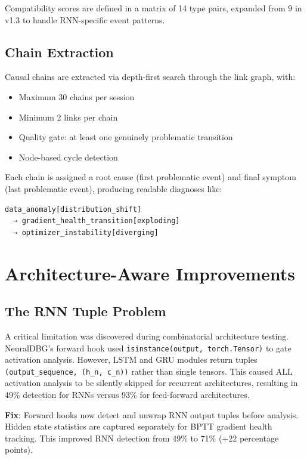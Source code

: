 \documentclass[11pt]{article}
\begin{document}
Compatibility scores are defined in a matrix of 14 type pairs, expanded from 9 in v1.3 to handle RNN-specific event patterns.

\subsection{Chain Extraction}

Causal chains are extracted via depth-first search through the link graph, with:
\begin{itemize}
    \item Maximum 30 chains per session
    \item Minimum 2 links per chain
    \item Quality gate: at least one genuinely problematic transition
    \item Node-based cycle detection
\end{itemize}

Each chain is assigned a root cause (first problematic event) and final symptom (last problematic event), producing readable diagnoses like:

\begin{verbatim}
data_anomaly[distribution_shift]
  → gradient_health_transition[exploding]
  → optimizer_instability[diverging]
\end{verbatim}

\section{Architecture-Aware Improvements}

\subsection{The RNN Tuple Problem}

A critical limitation was discovered during combinatorial architecture testing. NeuralDBG's forward hook used \texttt{isinstance(output, torch.Tensor)} to gate activation analysis. However, LSTM and GRU modules return tuples \texttt{(output\_sequence, (h\_n, c\_n))} rather than single tensors. This caused ALL activation analysis to be silently skipped for recurrent architectures, resulting in 49\% detection for RNNs versus 93\% for feed-forward architectures.

\textbf{Fix}: Forward hooks now detect and unwrap RNN output tuples before analysis. Hidden state statistics are captured separately for BPTT gradient health tracking. This improved RNN detection from 49\% to 71\% (+22 percentage points).
\end{document}
